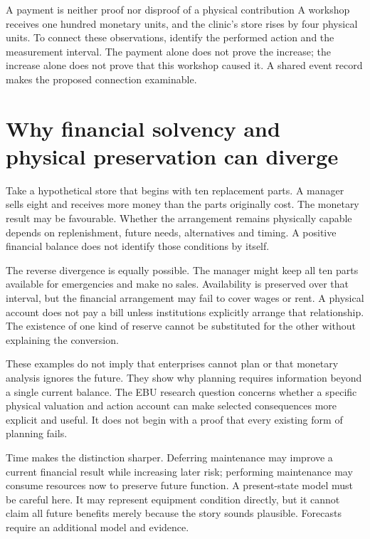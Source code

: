 \begin{workedbox}{A payment is neither proof nor disproof of a physical contribution}
A workshop receives one hundred monetary units, and the clinic's store rises by four physical units. To connect these observations, identify the performed action and the measurement interval. The payment alone does not prove the increase; the increase alone does not prove that this workshop caused it. A shared event record makes the proposed connection examinable.
\end{workedbox}

\section{Why financial solvency and physical preservation can diverge}
Take a hypothetical store that begins with ten replacement parts. A manager sells eight and receives more money than the parts originally cost. The monetary result may be favourable. Whether the arrangement remains physically capable depends on replenishment, future needs, alternatives and timing. A positive financial balance does not identify those conditions by itself.

The reverse divergence is equally possible. The manager might keep all ten parts available for emergencies and make no sales. Availability is preserved over that interval, but the financial arrangement may fail to cover wages or rent. A physical account does not pay a bill unless institutions explicitly arrange that relationship. The existence of one kind of reserve cannot be substituted for the other without explaining the conversion.

These examples do not imply that enterprises cannot plan or that monetary analysis ignores the future. They show why planning requires information beyond a single current balance. The EBU research question concerns whether a specific physical valuation and action account can make selected consequences more explicit and useful. It does not begin with a proof that every existing form of planning fails.

Time makes the distinction sharper. Deferring maintenance may improve a current financial result while increasing later risk; performing maintenance may consume resources now to preserve future function. A present-state model must be careful here. It may represent equipment condition directly, but it cannot claim all future benefits merely because the story sounds plausible. Forecasts require an additional model and evidence.

